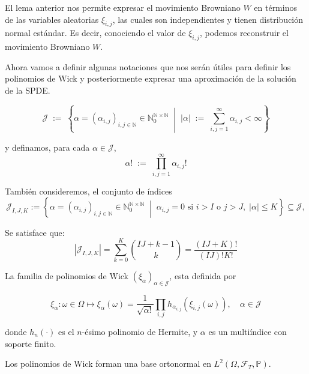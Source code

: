 \begin{obs}[]
  El lema anterior nos permite expresar el movimiento Browniano $W$ en términos de las variables aleatorias $\xi_{i,j}$, las cuales son independientes y tienen distribución normal estándar. Es decir, conociendo el valor de $\xi_{i,j}$, podemos reconstruir el movimiento Browniano $W$.
\end{obs}

Ahora vamos a definir algunas notaciones que nos serán útiles para definir los polinomios de Wick y posteriormente expresar una aproximación de la solución de la SPDE.

\begin{nota}[]
  \[
    \mathcal{J} \;:=\; \left\{\alpha = (\alpha_{i,j})_{i,j \in \mathbb{N}} \in \mathbb{N}_{0}^{\mathbb{N} \times \mathbb{N}} \;\middle|\; |\alpha| \;:=\; \sum_{i,j=1}^{\infty}\alpha_{i,j} < \infty \right\}
  \]

  y definamos, para cada $\alpha \in \mathcal{J}$,
  \[
    \alpha! \;:=\; \prod_{i,j=1}^{\infty} \alpha_{i,j}!
  \]

  También consideremos, el conjunto de índices
  \[
    \mathcal{J}_{I, J, K} := \left\{ \alpha = (\alpha_{i,j})_{i,j \in \mathbb{N}} \in \mathbb{N}_0^{\mathbb{N} \times \mathbb{N}} \;\middle|\; \alpha_{i,j} = 0 \text{ si } i > I \text{ o } j > J,\; |\alpha| \leqslant K \right\} \subseteq \mathcal{J},
  \]
\end{nota}

\begin{obs}[]
  Se satisface que:
  \[
    \left|\mathcal{J}_{I, J, K}\right| = \sum_{k=0}^{K} \binom{IJ + k - 1}{k} = \frac{(IJ + K)!}{(IJ)!K!}
  \]
\end{obs}

\begin{defn}
  La familia de polinomios de Wick $(\xi_\alpha)_{\alpha \in \mathcal{J}}$, esta definida por

  \begin{equation}
    \xi_\alpha : \omega \in \Omega \mapsto \xi_{
    \alpha}(\omega) = \frac{1}{\sqrt{\alpha!}} \prod_{i,j} h_{\alpha_{i,j}}(\xi_{i,j} (\omega)), \quad \alpha \in \mathcal{J}
  \end{equation}

  donde $h_n(\cdot)$ es el $n$-ésimo polinomio de Hermite, y $\alpha$ es un multiíndice con soporte finito.
\end{defn}

\begin{prop}[]
  Los polinomios de Wick forman una base ortonormal en $L^2(\Omega, \mathcal{F}_T, \mathbb{P})$.
\end{prop}

